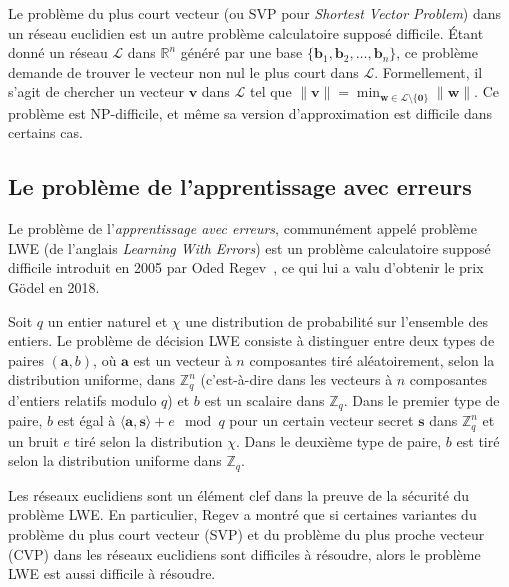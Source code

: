 Le problème du plus court vecteur (ou SVP pour \emph{Shortest Vector Problem}) dans un réseau euclidien est un autre problème calculatoire supposé difficile. Étant donné un réseau $\mathcal{L}$ dans $\mathbb{R}^n$ généré par une base $\{\mathbf{b}_1, \mathbf{b}_2, \ldots, \mathbf{b}_n\}$, ce problème demande de trouver le vecteur non nul le plus court dans $\mathcal{L}$. Formellement, il s’agit de chercher un vecteur $\mathbf{v}$ dans $\mathcal{L}$ tel que $\|\mathbf{v}\| = \min_{\mathbf{w} \in \mathcal{L} \setminus \{ \mathbf{0} \}} \|\mathbf{w}\|$. Ce problème est NP-difficile, et même sa version d'approximation est difficile dans certains cas. 

\subsection{Le problème de l’apprentissage avec erreurs}

Le problème de l’\emph{apprentissage avec erreurs}, communément appelé problème LWE (de l’anglais \emph{Learning With Errors}) est un problème calculatoire supposé difficile introduit en 2005 par Oded Regev~\cite{STOC:Regev05}, ce qui lui a valu d’obtenir le prix Gödel en 2018.




Soit $q$ un entier naturel et $\chi$ une distribution de probabilité sur l'ensemble des entiers. Le problème de décision LWE consiste à distinguer entre deux types de paires $(\mathbf{a}, b)$, où $\mathbf{a}$ est un vecteur à $n$ composantes tiré aléatoirement, selon la distribution uniforme, dans $\mathbb{Z}_q^n$ (c’est-à-dire dans les vecteurs à $n$ composantes d’entiers relatifs modulo $q$) et $b$ est un scalaire dans $\mathbb{Z}_q$. Dans le premier type de paire, $b$ est égal à $\langle\mathbf{a},\mathbf{s}\rangle + e \mod q$ pour un certain vecteur secret $\mathbf{s}$ dans $\mathbb{Z}_q^n$ et un bruit $e$ tiré selon la distribution $\chi$. Dans le deuxième type de paire, $b$ est tiré selon la distribution uniforme dans $\mathbb{Z}_q$.


Les réseaux euclidiens sont un élément clef dans la preuve de la sécurité du problème LWE. En particulier, Regev a montré que si certaines variantes du problème du plus court vecteur (SVP) et du problème du plus proche vecteur (CVP) dans les réseaux euclidiens sont difficiles à résoudre, alors le problème LWE est aussi difficile à résoudre.


